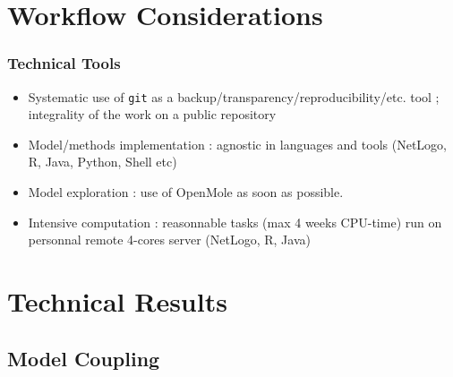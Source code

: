 \section{Workflow Considerations}


\begin{frame}
\frametitle{Technical Tools}

\begin{itemize}
\item \begin{justify}Systematic use of \texttt{git} as a backup/transparency/reproducibility/etc. tool ; integrality of the work on a public repository\end{justify}\vfill
\item \begin{justify}Model/methods implementation : agnostic in languages and tools (NetLogo, R, Java, Python, Shell etc)\end{justify}\vfill
\item \begin{justify}Model exploration : use of OpenMole as soon as possible.\end{justify}\vfill
\item \begin{justify}Intensive computation : reasonnable tasks (max 4 weeks CPU-time) run on personnal remote 4-cores server (NetLogo, R, Java)\end{justify}

\end{itemize}

\end{frame}






\section{Technical Results}


\subsection{Model Coupling}


